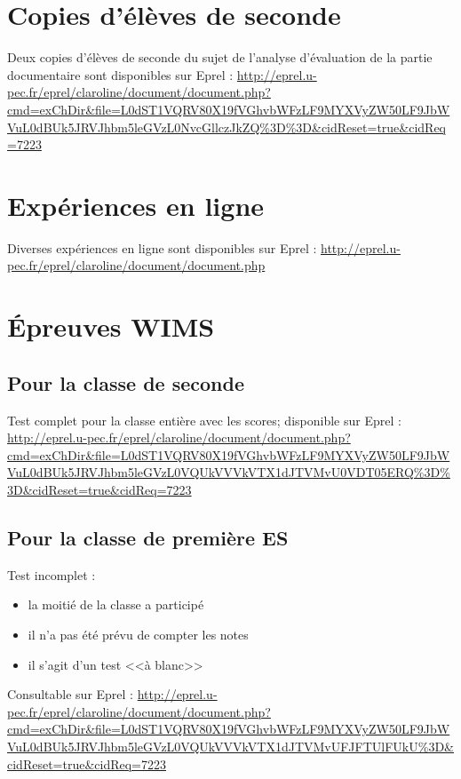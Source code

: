 \appendix

\chapter{Copies d'élèves de seconde}

Deux copies d'élèves de seconde du sujet de l'analyse d'évaluation de la partie documentaire sont disponibles sur Eprel :  \url{http://eprel.u-pec.fr/eprel/claroline/document/document.php?cmd=exChDir\&file=L0dST1VQRV80X19fVGhvbWFzLF9MYXVyZW50LF9JbWVuL0dBUk5JRVJhbm5leGVzL0NvcGllczJkZQ\%3D\%3D\&cidReset=true\&cidReq=7223}

\chapter{Expériences en ligne}

Diverses expériences en ligne sont disponibles sur Eprel :
\url{http://eprel.u-pec.fr/eprel/claroline/document/document.php}

\chapter{\'Epreuves WIMS}

\section{Pour la classe de seconde}

Test complet pour la classe entière avec les scores; disponible sur Eprel :
\url{http://eprel.u-pec.fr/eprel/claroline/document/document.php?cmd=exChDir\&file=L0dST1VQRV80X19fVGhvbWFzLF9MYXVyZW50LF9JbWVuL0dBUk5JRVJhbm5leGVzL0VQUkVVVkVTX1dJTVMvU0VDT05ERQ\%3D\%3D\&cidReset=true\&cidReq=7223}

\section{Pour la classe de première ES}

Test incomplet :
\begin{itemize}
\item la moitié de la classe a participé
\item il n'a pas été prévu de compter les notes
\item il s'agit d'un test <<à blanc>>
\end{itemize}

Consultable sur Eprel :
\url{http://eprel.u-pec.fr/eprel/claroline/document/document.php?cmd=exChDir\&file=L0dST1VQRV80X19fVGhvbWFzLF9MYXVyZW50LF9JbWVuL0dBUk5JRVJhbm5leGVzL0VQUkVVVkVTX1dJTVMvUFJFTUlFUkU\%3D\&cidReset=true\&cidReq=7223} 

